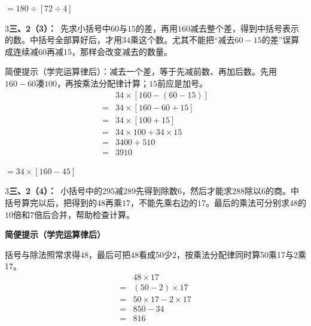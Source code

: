 \documentclass[multi=snippet,border={5bp 20bp 5bp 5bp}]{standalone}
\newenvironment{snippet}[3]{\begin{minipage}{#1bp}\color{answerred}\fontsize{#2}{#3}\selectfont\raggedright}{\end{minipage}}
\begin{document}
\begin{snippet}{82.09676513671877}{10}{12.8}\SourceSans\setlength{\mathindent}{2bp}\(\displaystyle=180\div[72\div4]\)\end{snippet}
\begin{snippet}{505}{11.5}{14}\begin{multicols}{3}\raggedcolumns \textbf{三、2（3）：}\ 先求小括号中\(60\)\allowbreak 与\(15\)\allowbreak 的差，再用\(160\)\allowbreak 减去整个差，得到中括号表示的数。中括号全部算好后，才用\(34\)\allowbreak 乘这个数。尤其不能把“减去\(60-15\)\allowbreak 的差”误算成连续减\(60\)\allowbreak 再减\(15\)\allowbreak ，那样会改变减去的数量。\par 简便提示（学完运算律后）：减去一个差，等于先减前数、再加后数。先用\(160-60\)\allowbreak 凑\(100\)\allowbreak ，再按乘法分配律计算；\(15\)\allowbreak 前应是加号。\[\begin{aligned}&34\times[160-(60-15)]\\={}&34\times[160-60+15]\\={}&34\times[100+15]\\={}&34\times100+34\times15\\={}&3400+510\\={}&3910\end{aligned}\]\end{multicols}\end{snippet}
\begin{snippet}{87.07808837890626}{10}{12.8}\SourceSans\setlength{\mathindent}{2bp}\(\displaystyle=34\times[160-45]\)\end{snippet}
\begin{snippet}{505}{11.5}{14}\begin{multicols}{3}\raggedcolumns \textbf{三、2（4）：}\ 小括号中的\(295\)\allowbreak 减\(289\)\allowbreak 先得到除数\(6\)\allowbreak ，然后才能求\(288\)\allowbreak 除以\(6\)\allowbreak 的商。中括号算完以后，把得到的\(48\)\allowbreak 再乘\(17\)\allowbreak ，不能先乘右边的\(17\)\allowbreak 。最后的乘法可分别求\(48\)\allowbreak 的\(10\)\allowbreak 倍和\(7\)\allowbreak 倍后合并，帮助检查计算。\par\textbf{简便提示（学完运算律后）}\par 括号与除法照常求得48，最后可把48看成50少2，按乘法分配律同时算50乘17与2乘17。\[\begin{aligned}&48\times17\\={}&(50-2)\times17\\={}&50\times17-2\times17\\={}&850-34\\={}&816\end{aligned}\]\end{multicols}\end{snippet}
\end{document}
